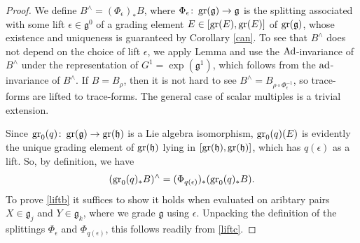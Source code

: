 \documentclass[leqno,12pt]{amsart} %
\begin{document}
\begin{proof}
  We define $B^\wedge = (\Phi_\epsilon)_*B$, where
  $\Phi_\epsilon \colon \operatorname{\operatorname{gr}}({\mathfrak g}) \rightarrow {\mathfrak g} $ is the
  splitting associated with some lift $\epsilon \in {\mathfrak g}^0 $ of a grading element
  $E \in [\operatorname{\operatorname{gr}}(E), \operatorname{\operatorname{gr}}(E)]$ of $\operatorname{\operatorname{gr}}({\mathfrak g})$, whose existence and
  uniqueness is guaranteed by Corollary \ref{can}. To see that $B^\wedge$ does not depend
  on the choice of lift $\epsilon $, we apply Lemma  and
  use the $\operatorname{Ad}$-invariance of $B^\wedge$ under the representation of
  $G^1=\exp({\mathfrak g}^1)$, which follows from the $\operatorname{ad}$-invariance of $B^\wedge$.
  If $B = B_\rho$, then it is not hard to see
  $B^\wedge = B_{\rho \circ \Phi_\epsilon^{-1}}$, so trace-forms are lifted to
  trace-forms. The general case of scalar multiples is a trivial extension.

  Since $\operatorname{\operatorname{gr}}_0(q) \colon \operatorname{\operatorname{gr}}({\mathfrak g}) \rightarrow \operatorname{\operatorname{gr}}({\mathfrak h})$ is
  a Lie algebra isomorphism, $\operatorname{\operatorname{gr}}_0(q)(E)$ is evidently the unique grading element of
  $\operatorname{\operatorname{gr}}({\mathfrak h}) $ lying in $[\operatorname{\operatorname{gr}}({\mathfrak h}), \operatorname{\operatorname{gr}}({\mathfrak h})]$,
  which has $q(\epsilon)$ as a lift. So, by definition, we have
  \begin{equation}
    \label{liftc}
  (\operatorname{\operatorname{gr}}_0(q)_*B)^\wedge = (\Phi_{q(\epsilon)})_*(\operatorname{\operatorname{gr}}_0(q)_*B).
  \end{equation}
  To prove \eqref{liftb} it suffices to show it holds when evaluated on aribtary pairs
  $X \in {\mathfrak g}_j$ and $Y \in {\mathfrak g}_k$, where we grade ${\mathfrak g} $
  using $\epsilon $. Unpacking the definition of the splittings $\Phi_\epsilon$ and
  $\Phi_{q(\epsilon)}$, this follows readily from \eqref{liftc}.
\end{proof}


\end{document}
